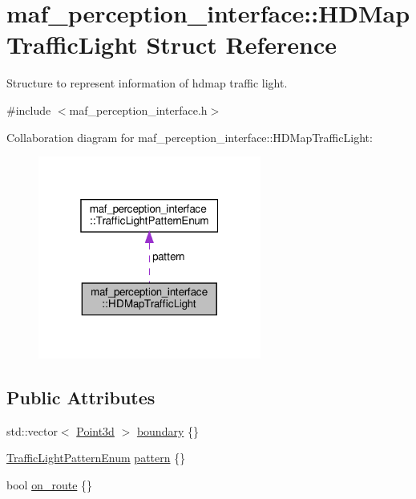 \hypertarget{structmaf__perception__interface_1_1HDMapTrafficLight}{}\section{maf\+\_\+perception\+\_\+interface\+:\+:H\+D\+Map\+Traffic\+Light Struct Reference}
\label{structmaf__perception__interface_1_1HDMapTrafficLight}


Structure to represent information of hdmap traffic light.  




{\ttfamily \#include $<$maf\+\_\+perception\+\_\+interface.\+h$>$}



Collaboration diagram for maf\+\_\+perception\+\_\+interface\+:\+:H\+D\+Map\+Traffic\+Light\+:\nopagebreak
\begin{figure}[H]
\begin{center}
\leavevmode
\includegraphics[width=208pt]{structmaf__perception__interface_1_1HDMapTrafficLight__coll__graph}
\end{center}
\end{figure}
\subsection*{Public Attributes}
\begin{DoxyCompactItemize}
\item 
std\+::vector$<$ \hyperlink{structmaf__perception__interface_1_1Point3d}{Point3d} $>$ \hyperlink{structmaf__perception__interface_1_1HDMapTrafficLight_a6dbf94910d7335ab35d19c54b8762d66}{boundary} \{\}
\item 
\hyperlink{structmaf__perception__interface_1_1TrafficLightPatternEnum}{Traffic\+Light\+Pattern\+Enum} \hyperlink{structmaf__perception__interface_1_1HDMapTrafficLight_a3aa4bdf133e05a1d8eabbdf95f304b61}{pattern} \{\}
\item 
bool \hyperlink{structmaf__perception__interface_1_1HDMapTrafficLight_af5a5b4e4cf7163a698c4ecc063b86934}{on\+\_\+route} \{\}
\end{DoxyCompactItemize}


